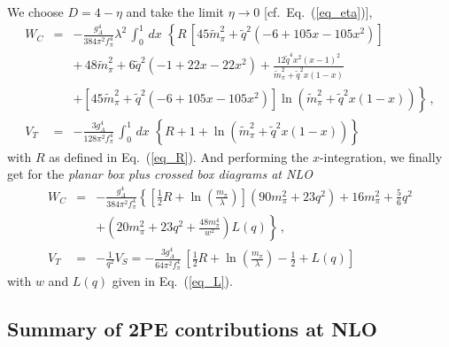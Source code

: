 \documentclass[sort&compress,preprint,3p]{elsarticle}
\begin{document}
%
We choose $D=4-\eta$ and take the limit $\eta \to 0$
[cf.~Eq.~(\ref{eq_eta})],
%
\begin{eqnarray}
W_C &=& -\frac{g_A^4}{384\pi^2 f_\pi^4} \lambda^{2}\,
\int_0^1\, dx\,\, \left\{
R\,\left[45 \tilde m_\pi^2 +\tilde q^2(-6+105x-105x^2 ) \right] 
\right. \nonumber \\ && \left.
+\, 48 \tilde m_\pi^2 + 6\tilde q^2(-1+22x-22x^2 ) +
\frac{12 \tilde q^4 x^2(x-1)^2}{\tilde m_\pi^2+\tilde q^2 x(1-x)}
\right. \nonumber \\ && \left.
+\left[ 45\tilde m_\pi^2+\tilde q^2(-6+105x-105x^2)\right] 
\ln (\tilde m_\pi^2+\tilde q^2 x(1-x))
\right\}
\,,
\\
V_T &=& -\frac{3g_A^4}{128 \pi^2f_\pi^4} \,
\int_0^1\, dx\,\,
\left\{  R + 1 + \ln (\tilde m_\pi^2+\tilde q^2 x(1-x)) \right\}
\end{eqnarray}
with $R$ as defined in Eq.~(\ref{eq_R}).
%
And performing the $x$-integration, we finally get
for the {\it planar box plus crossed box diagrams at NLO}
%
\begin{eqnarray}
W_C &=& -\frac{g_A^4}{384\pi^2 f_\pi^4} 
\left\{
\left[\frac{1}{2} R+\ln \left(\frac{m_\pi}{\lambda}\right)\right] (90 m_\pi^2 +23q^2)
+16 m_\pi^2 + \frac{5}{6} q^2 
\right. \nonumber \\ && \left.
+\left(20m_\pi^2+23q^2+\frac{48m_\pi^4}{w^2}\right) L(q)
\right\}
\,,
\label{eq_WCboxes}
\\
V_T &=& - \frac{1}{q^2} V_S =  
-\frac{3g_A^4}{64 \pi^2f_\pi^4} \,
\left[ \frac{1}{2} R+\ln \left(\frac{m_\pi}{\lambda}\right) 
-\frac{1}{2} +L(q) \right]
\label{eq_VTboxes}
\end{eqnarray}
with $w$ and $L(q)$ given in Eq.~(\ref{eq_L}).
%


\subsection{Summary of 2PE contributions at NLO}
\end{document}
